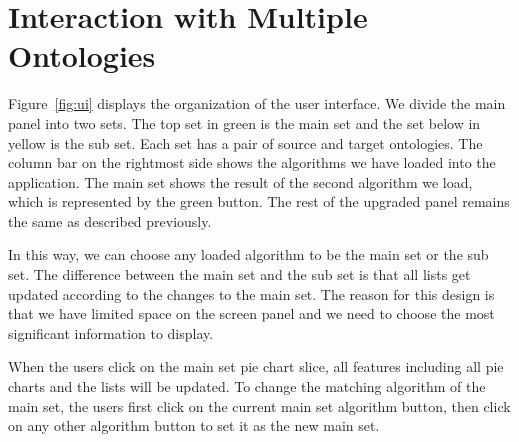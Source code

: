 \section{Interaction with Multiple Ontologies} %
\label{sub:loading_multiple_ontology}

Figure~\ref{fig:ui} displays the organization of the user interface.
We divide the main panel into two sets. The top set in green is the
main set and the set below in yellow is the sub set. Each set has a
pair of source and target ontologies. The column bar on the rightmost
side shows the algorithms we have loaded into the application. The
main set shows the result of the second algorithm we load, which is
represented by the green button. The rest of the upgraded panel
remains the same as described previously.

In this way, we can choose any loaded algorithm to be the main set or
the sub set. The difference between the main set and the sub set is that
all lists get updated according to the changes to the main set. The reason for this design is that we have limited space on the screen panel and we need to choose the most significant information to display.

When the users click on the main set pie chart slice, all features
including all pie charts and the lists will be updated. To change the
matching algorithm of the main set, the users first click on the current main set algorithm button, then click on any other algorithm button to set it as the new main set.



